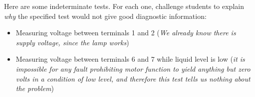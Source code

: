 \vskip 10pt

Here are some indeterminate tests.  For each one, challenge students to explain {\it why} the specified test would not give good diagnostic information:

\begin{itemize}
\item{} Measuring voltage between terminals 1 and 2 ({\it We already know there is supply voltage, since the lamp works})
\vskip 5pt
\item{} Measuring voltage between terminals 6 and 7 while liquid level is low ({\it it is impossible for any fault prohibiting motor function to yield anything but zero volts in a condition of low level, and therefore this test tells us nothing about the problem})
\end{itemize}





